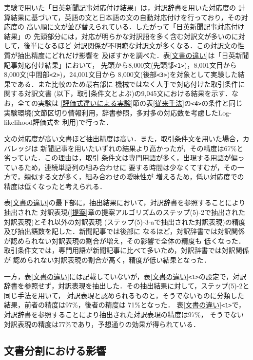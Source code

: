 実験で用いた「日英新聞記事対応付け結果」\cite{内山:2003}は，対訳辞書を用いた対応度の
計算結果に基づいて，英語の文と日本語の文の自動対応付けを行っており，その対応度の
高い順に文が並び替えられている．したがって「日英新聞記事対応付け結果」の
先頭部分には，対応が明らかな対訳語を多く含む対訳文が多いのに対して，後半になるほど
対訳関係が不明瞭な対訳文が多くなる．この対訳文の性質が抽出精度にどれだけ影響を
及ぼすかを調べた．表\ref{文書の違い}は「日英新聞記事対応付け結果」において，
先頭から8,000文(先頭部\verb|<1>|)，8,001文目から8,000文(中間部\verb|<2>|)，24,001文目から
8,000文(後部\verb|<3>|)を対象として実験した結果である．また比較のため最右部に
機械ではなく人手で対応付けた取引条件に関する対訳文書\cite{石上:1992}
(以下，取引条件文とよぶ)の9,045文における結果を示す．なお，全ての実験は
\ref{評価式違いによる実験}節の表\ref{従来手法}の\verb|<4>|の条件と同じ
実験環境(文節区切り情報利用，辞書参照，多対多の対応数を考慮したLog-likelihood評価式を
利用)で行った．

文の対応度が高い文書ほど抽出精度は高い．また，取引条件文を用いた場合，カバレッジは
新聞記事を用いたいずれの結果より高かったが，その精度は67\%と劣っていた．この理由は，取引
条件文は専門用語が多く，出現する用語が偏っているため，連続単語列の組み合わせに
要する時間は少なくてすむが，その一方で，類似する文が多く，組み合わせの曖昧性が
増えるため，低い対応度での精度は低くなったと考えられる．

表\ref{文書の違い}の最下部に，抽出結果において，対訳辞書を参照することにより抽出された
対訳表現(\ref{提案}章の提案アルゴリズムのステップ(5)-2で抽出された対訳表現)とそれ以外の対訳表現
(ステップ(5)-3-aで抽出された対訳表現)の精度及び抽出語数を記した．新聞記事では後部に
なるほど，対訳辞書では対訳関係が認められない対訳表現の割合が増え，その影響で全体の精度も
低くなった． 
取引条件文では，専門用語が新聞記事に比べて多いため，対訳辞書では対訳関係が
認められない対訳表現の割合が高く，精度が低い結果となった．

一方，表\ref{文書の違い}には記載していないが，表\ref{文書の違い}\verb|<1>|の設定で，対訳
辞書を参照せず，対訳表現を抽出した．その抽出結果に対して，ステップ(5)-2と同じ手法を用いて，
対訳表現と認められるものと，そうでないものに分類した結果，前者の精度は97\%，後者の精度は
71\%となった．
表\ref{文書の違い}\verb|<1>|で，対訳辞書を参照することにより抽出された対訳表現の精度は97\%，
そうでない対訳表現の精度は77\%であり，予想通りの効果が得られている．

\subsection{文書分割における影響}
\label{文書分割実験}

